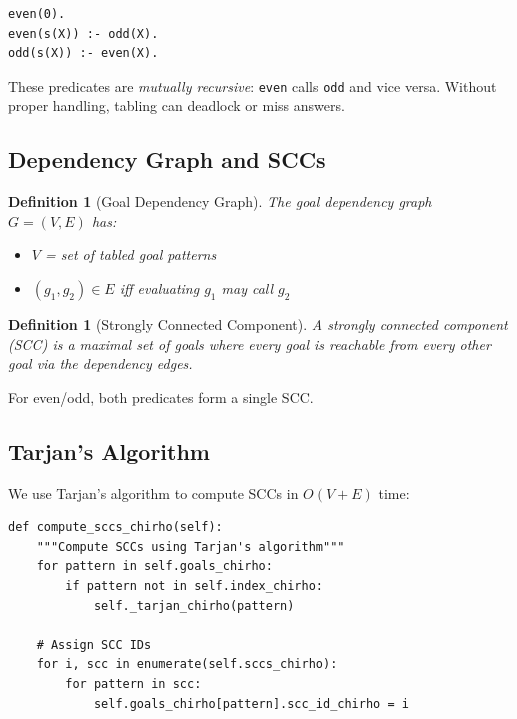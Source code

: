 \documentclass[11pt,a4paper]{article}
\newtheorem{definition}[theorem]{Definition}
\begin{document}
\begin{lstlisting}[caption={Mutually recursive even/odd}]
even(0).
even(s(X)) :- odd(X).
odd(s(X)) :- even(X).
\end{lstlisting}

These predicates are \emph{mutually recursive}: \texttt{even} calls \texttt{odd}
and vice versa. Without proper handling, tabling can deadlock or miss answers.

\subsection{Dependency Graph and SCCs}
\label{subsec:dependency_chirho}

\begin{definition}[Goal Dependency Graph]
\label{def:dependency_graph_chirho}
The \emph{goal dependency graph} $G = (V, E)$ has:
\begin{itemize}
  \item $V$ = set of tabled goal patterns
  \item $(g_1, g_2) \in E$ iff evaluating $g_1$ may call $g_2$
\end{itemize}
\end{definition}

\begin{definition}[Strongly Connected Component]
\label{def:scc_chirho}
A \emph{strongly connected component} (SCC) is a maximal set of goals where
every goal is reachable from every other goal via the dependency edges.
\end{definition}

For even/odd, both predicates form a single SCC.

\subsection{Tarjan's Algorithm}
\label{subsec:tarjan_chirho}

We use Tarjan's algorithm to compute SCCs in $O(V+E)$ time:

\begin{lstlisting}[caption={SCC computation}]
def compute_sccs_chirho(self):
    """Compute SCCs using Tarjan's algorithm"""
    for pattern in self.goals_chirho:
        if pattern not in self.index_chirho:
            self._tarjan_chirho(pattern)

    # Assign SCC IDs
    for i, scc in enumerate(self.sccs_chirho):
        for pattern in scc:
            self.goals_chirho[pattern].scc_id_chirho = i
\end{lstlisting}
\end{document}
